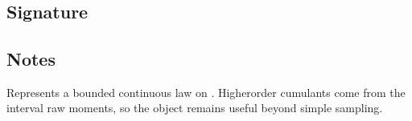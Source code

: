 \documentclass[letterpaper,10pt,english]{sphinxmanual}
\begin{document}
\section{}
\label{\detokenize{object_api_reference:uniform}}

\subsection{Signature}
\label{\detokenize{object_api_reference:id28}}
\begin{sphinxVerbatim}[commandchars=\\\{\}]

\end{sphinxVerbatim}


\subsection{Notes}
\label{\detokenize{object_api_reference:id29}}
\sphinxAtStartPar
Represents a bounded continuous law on . Higher\sphinxhyphen{}order cumulants come from the interval raw moments, so the object remains useful beyond simple sampling.
\end{document}
